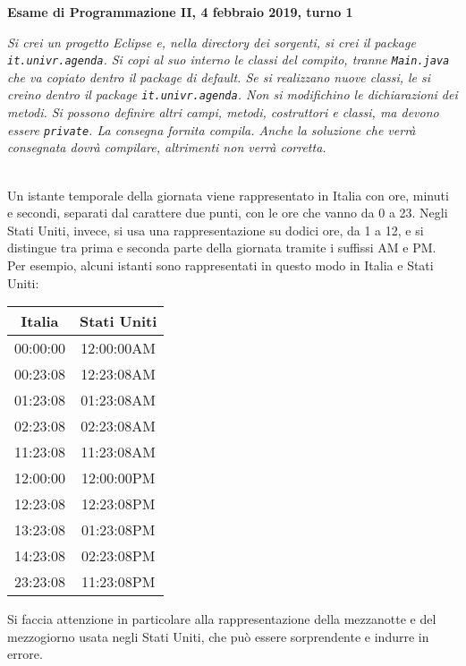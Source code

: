 \documentclass[12pt]{article}
\begin{document}
\begin{center} {\bf Esame di Programmazione II, 4 febbraio 2019, turno 1}\end{center}

\emph{
Si crei un progetto Eclipse e, nella directory dei sorgenti,
si crei il package \texttt{it.univr.agenda}. Si copi al suo interno
le classi del compito, tranne \texttt{Main.java} che va copiato
dentro il package di default.
Se si realizzano nuove classi, le si creino dentro
il package \texttt{it.univr.agenda}.
Non si modifichino le dichiarazioni dei metodi. Si possono definire altri campi,
metodi, costruttori e classi, ma devono essere \texttt{private}.
La consegna fornita compila.
Anche la soluzione che verr\`a consegnata dovr\`a compilare,
altrimenti non verr\`a corretta.
}

\mbox{}\\

Un istante temporale della giornata viene rappresentato in Italia
con ore, minuti e secondi, separati dal carattere due punti, con le ore che
vanno da 0 a 23. Negli Stati Uniti, invece, si usa una
rappresentazione su dodici ore, da 1 a 12, e si distingue tra prima e seconda
parte della giornata tramite i suffissi AM e PM. Per esempio, alcuni istanti
sono rappresentati in questo modo in Italia e Stati Uniti:

\begin{center}
  \begin{tabular}{|c|c|}
    \hline
    Italia & Stati Uniti \\\hline\hline
    00:00:00 & 12:00:00AM \\\hline
    00:23:08 & 12:23:08AM \\\hline
    01:23:08 & 01:23:08AM \\\hline
    02:23:08 & 02:23:08AM \\\hline
    11:23:08 & 11:23:08AM \\\hline\hline
    12:00:00 & 12:00:00PM \\\hline
    12:23:08 & 12:23:08PM \\\hline
    13:23:08 & 01:23:08PM \\\hline
    14:23:08 & 02:23:08PM \\\hline
    23:23:08 & 11:23:08PM \\\hline
  \end{tabular}
\end{center}
%
Si faccia attenzione in particolare alla rappresentazione della mezzanotte
e del mezzogiorno usata negli Stati Uniti, che pu\`o essere
sorprendente e indurre in errore.
\end{document}
